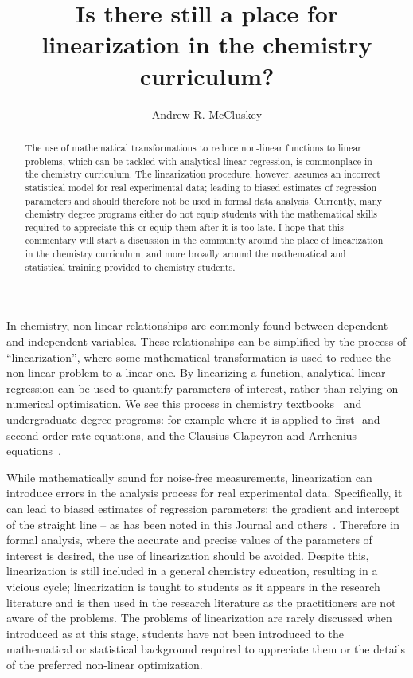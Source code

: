 \documentclass[journal=jceda8,manuscript=article]{achemso}
\author{Andrew R. McCluskey}
\affiliation{School of Chemistry, University of Bristol, Cantock's Close, Bristol, BS8 1TS, United Kingdom}
\title{Is there still a place for linearization in the chemistry curriculum?}
\begin{document}
\begin{abstract}
    The use of mathematical transformations to reduce non-linear functions to linear problems, which can be tackled with analytical linear regression, is commonplace in the chemistry curriculum. 
    The linearization procedure, however, assumes an incorrect statistical model for real experimental data; leading to biased estimates of regression parameters and should therefore not be used in formal data analysis. 
    Currently, many chemistry degree programs either do not equip students with the mathematical skills required to appreciate this or equip them after it is too late.
    I hope that this commentary will start a discussion in the community around the place of linearization in the chemistry curriculum, and more broadly around the mathematical and statistical training provided to chemistry students. 
\end{abstract}

\maketitle 

In chemistry, non-linear relationships are commonly found between dependent and independent variables.
These relationships can be simplified by the process of ``linearization'', where some mathematical transformation is used to reduce the non-linear problem to a linear one. 
By linearizing a function, analytical linear regression can be used to quantify parameters of interest, rather than relying on numerical optimisation. 
We see this process in chemistry textbooks~\cite{monk_math_2010,atkins_physical_2018} and undergraduate degree programs: for example where it is applied to first- and second-order rate equations, and the Clausius-Clapeyron and Arrhenius equations~\cite{perrin_linear_2017,monk_math_2010}.

While mathematically sound for noise-free measurements, linearization can introduce errors in the analysis process for real experimental data. 
Specifically, it can lead to biased estimates of regression parameters; the gradient and intercept of the straight line -- as has been noted in this Journal and others~\cite{delevie_when_1986,rusling_minimizing_1988,zielinski_least_1997,denton_analysis_2000,levent_dont_2004,rittenhouse_chapter_2005,perrin_linear_2017,moeglich_open_2018,alamillo_mechanistic_2022}.
Therefore in formal analysis, where the accurate and precise values of the parameters of interest is desired, the use of linearization should be avoided. 
Despite this, linearization is still included in a general chemistry education, resulting in a vicious cycle; linearization is taught to students as it appears in the research literature and is then used in the research literature as the practitioners are not aware of the problems. 
The problems of linearization are rarely discussed when introduced as at this stage, students have not been introduced to the mathematical or statistical background required to appreciate them or the details of the preferred non-linear optimization.
\end{document}
